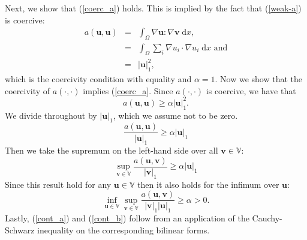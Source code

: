 \documentclass[12pt,a4paper]{article}
\theoremstyle{definition}
\begin{document}
Next, we show that (\ref{coerc_a}) holds.  This is implied by the fact that (\ref{weak-a}) is coercive:
\begin{eqnarray}
		a\left(\textbf{u},\textbf{u}\right)&=&\int_{\Omega}\nabla \textbf{u} : \nabla \textbf{v}\;\mathrm{d}x,\nonumber\\
		&=&\int_{\Omega}\sum_{i}\nabla u_i \cdot \nabla u_i\;\mathrm{d}x\text{ and}\nonumber\\
		&=&\left|\textbf{u}\right|_1^2,\nonumber
\end{eqnarray}
which is the coercivity condition with equality and $\alpha = 1$.  Now we show that  the coercivity of $a\left(\cdot,\cdot\right)$ implies (\ref{coerc_a}.  Since $a\left(\cdot,\cdot\right)$ is coercive, we have that
\begin{equation}
a\left(\textbf{u},\textbf{u}\right)\geq \alpha  \left|\textbf{u}\right|_1^2 \nonumber.
\end{equation}
We divide throughout by $\left|\textbf{u}\right|_1$, which we assume not to be zero. 
\begin{equation}
\frac{a\left(\textbf{u},\textbf{u}\right)}{\left|\textbf{u}\right|_1}\geq \alpha \left|\textbf{u}\right|_1 \nonumber
\end{equation}
 Then we take the supremum on the left-hand side over all $\textbf{v}\in\mathbb{V}$:
 \begin{equation}
 \sup_{\textbf{v}\in \mathbb{V}}\frac{a\left(\textbf{u},\textbf{v}\right)}{\left|\textbf{v}\right|_1}\geq \alpha \left|\textbf{u}\right|_1\nonumber
 \end{equation}
 Since this result hold for any $\textbf{u}\in \mathbb{V}$ then it also holds for the infimum over $\textbf{u}$:
\begin{equation}
\inf_{\textbf{u}\in \mathbb{V}}\sup_{\textbf{v}\in \mathbb{V}}\frac{a\left(\textbf{u},\textbf{v}\right)}{\left|\textbf{v}\right|_1\left|\textbf{u}\right|_1} \geq \alpha>0\nonumber.
\end{equation}
Lastly, (\ref{cont_a}) and (\ref{cont_b}) follow from an application of the Cauchy-Schwarz inequality on the corresponding bilinear forms.
\end{document}
